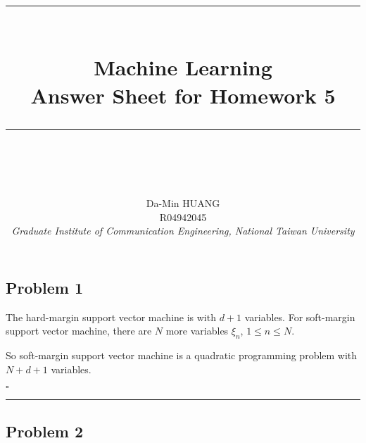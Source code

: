 \documentclass[12pt]{article}
\newcommand*{\QEDB}{\hfill\ensuremath{\square}}
\newcommand{\horrule}[1]{\rule{\linewidth}{#1}}
\begin{document}
\baselineskip 6.5mm
\setlength{\parindent}{0pt}
\title{ 
\normalfont \normalsize 
\horrule{0.5pt} \\[0.4cm]
\huge { \Huge Machine Learning \\ \large Answer Sheet for Homework 5 }\\ %
\horrule{2pt} \\ [0.5cm]
}
\author{ { \Large Da-Min HUANG } \\
{\small R04942045} \\
{\small\textit{Graduate Institute of Communication Engineering, National Taiwan University}}
}
\maketitle

\subsection*{Problem 1}

The hard-margin support vector machine is with $d+1$ variables. For soft-margin support vector machine, there are $N$ more variables $\xi_n$, $1\leq n\leq N$.

So soft-margin support vector machine is a quadratic programming problem with $N+d+1$ variables.

\QEDB

\horrule{0.5pt}

\subsection*{Problem 2}
\end{document}
